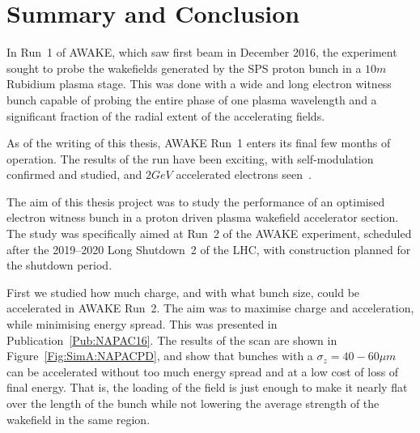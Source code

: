 %
%

\chapter{Summary and Conclusion}
\label{Ch:SnC}

In Run~1 of AWAKE, which saw first beam in December 2016, the experiment sought to probe the wakefields generated by the SPS proton bunch in a $10\unit{m}$ Rubidium plasma stage.
This was done with a wide and long electron witness bunch capable of probing the entire phase of one plasma wavelength and a significant fraction of the radial extent of the accelerating fields.

As of the writing of this thesis, AWAKE Run~1 enters its final few months of operation.
The results of the run have been exciting, with self-modulation confirmed and studied, and $2\unit{GeV}$ accelerated electrons seen~\cite{adli:2018}.

The aim of this thesis project was to study the performance of an optimised electron witness bunch in a proton driven plasma wakefield accelerator section.
The study was specifically aimed at Run~2 of the AWAKE experiment, scheduled after the 2019--2020 Long Shutdown~2 of the LHC, with construction planned for the shutdown period.


First we studied how much charge, and with what bunch size, could be accelerated in AWAKE Run~2.
The aim was to maximise charge and acceleration, while minimising energy spread.
This was presented in Publication~\ref{Pub:NAPAC16}.
The results of the scan are shown in Figure~\ref{Fig:SimA:NAPACPD}, and show that bunches with a $\sigma_z = 40-60\unit{\mu m}$ can be accelerated without too much energy spread and at a low cost of loss of final energy.
That is, the loading of the field is just enough to make it nearly flat over the length of the bunch while not lowering the average strength of the wakefield in the same region.

